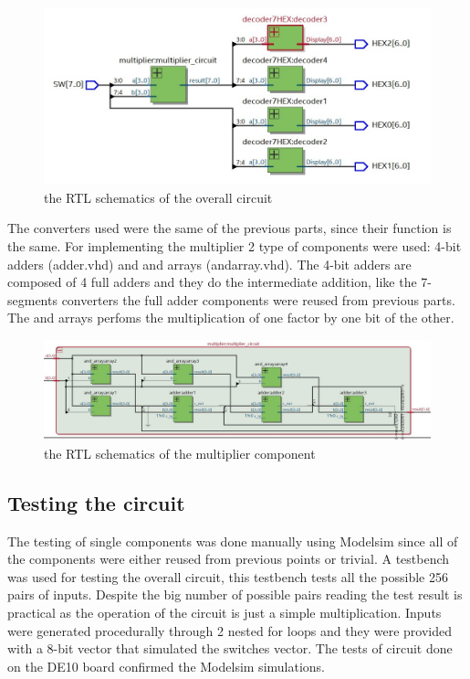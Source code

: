 \documentclass[12pt]{article}
\begin{document}
\begin{figure}[h]
	\centering
	\includegraphics[scale = 0.5]{immagini/RTL_architecture_4.jpg}
	\caption{the RTL schematics of the overall circuit}       

\end{figure}
The converters used were the same of the previous parts, since their function is the same.
For implementing the multiplier 2 type of components were used: 4-bit adders (adder.vhd) and and arrays (and\textunderscore array.vhd).
The 4-bit adders are composed of 4 full adders and they do the intermediate addition, like the 7-segments converters the full adder components were reused from previous parts.
The and arrays perfoms the multiplication of one factor by one bit of the other.
\begin{figure}[h]
	\centering
	\includegraphics[scale = 0.4]{immagini/RTL_multiplier.jpg}
	\caption{the RTL schematics of the multiplier component}       

\end{figure}
\subsection{Testing the circuit}
The testing of single components was done manually using Modelsim since all of the components were either reused from previous points or trivial. \newline
A testbench was used for testing the overall circuit, this testbench tests all the possible 256 pairs of inputs.
Despite the big number of possible pairs reading the test result is practical as the operation of the circuit is just a simple multiplication. \newline
Inputs were generated procedurally through 2 nested for loops and they were provided with a 8-bit vector that simulated the switches vector.\newline
The tests of circuit done on the DE10 board confirmed the Modelsim simulations.
\end{document}
